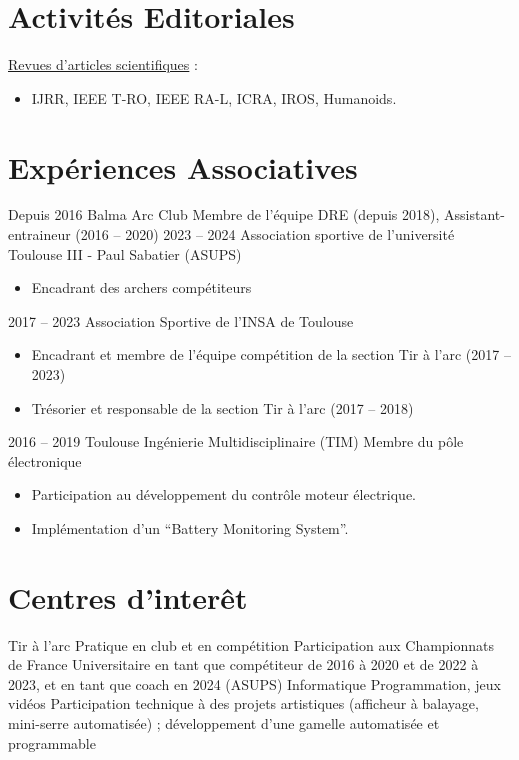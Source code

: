\documentclass[11pt,a4paper,sans]{moderncv}         %
\newcommand{\items}{\item \hspace{2mm}}
\begin{document}
\section{Activit\'es  Editoriales}
\large{\underline{Revues d'articles scientifiques} :}
\begin{itemize}%
\items IJRR, IEEE T-RO, IEEE RA-L, ICRA, IROS, Humanoids.
\end{itemize}

\section{Exp\'eriences Associatives}
\cventry
{Depuis 2016}
{Balma Arc Club}
{Membre de l'\'equipe DRE (depuis 2018), Assistant-entraineur (2016 -- 2020)}
{}
{}
{}
%
\cventry
{2023 -- 2024}
{Association sportive de l'universit\'e Toulouse III - Paul Sabatier (ASUPS)}
{}
{}
{}
{
  \begin{itemize}
    \item Encadrant des archers comp\'etiteurs
  \end{itemize}
}
%
\cventry
{2017 -- 2023}
{Association Sportive de l'INSA de Toulouse}
{}
{}
{}
{
  \begin{itemize}
    \item Encadrant et membre de l'\'equipe comp\'etition de la section Tir \`a l'arc (2017 -- 2023)
    \item Tr\'esorier et responsable de la section Tir \`a l'arc (2017 -- 2018)
  \end{itemize}
}
%
\cventry
{2016 -- 2019}
{Toulouse Ing\'enierie Multidisciplinaire (TIM)}
{Membre du p\^ole \'electronique}
{}
{}
{
  \begin{itemize}
    \item Participation au d\'eveloppement du contr\^ole moteur \'electrique.
    \item Impl\'ementation d'un ``Battery Monitoring System''.
  \end{itemize}
}
%

\section{Centres d'inter\^et}

\cventry
{Tir \`a l'arc}
{Pratique en club et en comp\'etition}
{Participation aux Championnats de France Universitaire en tant que comp\'etiteur de 2016 \`a 2020 et de 2022 \`a 2023, et en tant que coach en 2024 (ASUPS)}
{}
{}
{}
%
\cventry
{Informatique}
{Programmation, jeux vid\'eos}
{Participation technique \`a des projets artistiques (afficheur \`a balayage, mini-serre automatis\'ee) ; d\'eveloppement d'une gamelle automatis\'ee et programmable}
{}
{}
{}
%

\label{dernierepage}
\end{document}
